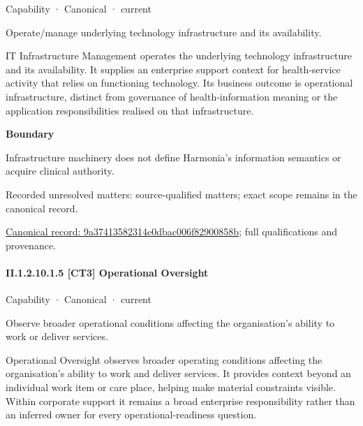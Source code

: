 \label{element:9a37413582314e0dbac006f82900858b}
{\small Capability · Canonical · current}\par

Operate/manage underlying technology infrastructure and its availability.



IT Infrastructure Management operates the underlying technology infrastructure and its availability. It supplies an enterprise support context for health-service activity that relies on functioning technology. Its business outcome is operational infrastructure, distinct from governance of health-information meaning or the application responsibilities realised on that infrastructure.



\textbf{Boundary}



Infrastructure machinery does not define Harmonia's information semantics or acquire clinical authority.


{\small Recorded unresolved matters: source-qualified matters; exact scope remains in the canonical record.}\par
{\footnotesize \href{../../../../continuum/strategy/capability/9a37413582314e0dbac006f82900858b.md}{Canonical record: 9a37413582314e0dbac006f82900858b}; full qualifications and provenance.}\par
\paragraph*{II.1.2.10.1.5 [CT3] Operational Oversight}
\label{navigation:II.1.2.10.1.5}

\label{element:d6f39d94cd2e4bf2ab91ff58ba604ab0}
{\small Capability · Canonical · current}\par

Observe broader operational conditions affecting the organisation’s ability to work or deliver services.



Operational Oversight observes broader operating conditions affecting the organisation's ability to work and deliver services. It provides context beyond an individual work item or care place, helping make material constraints visible. Within corporate support it remains a broad enterprise responsibility rather than an inferred owner for every operational-readiness question.



